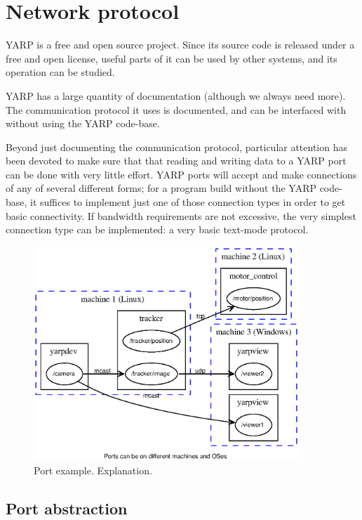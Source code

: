 
\section{Network protocol}

YARP is a free and open source project.  Since its source code is
released under a free and open license, useful parts of it can be used
by other systems, and its operation can be studied.

YARP has a large quantity of documentation (although we always need
more).  The communication protocol it uses is documented, and can be
interfaced with without using the YARP code-base.

Beyond just documenting the communication protocol, particular attention
has been devoted to make sure that that reading and writing data to a
YARP port can be done with very little effort.  YARP ports will 
accept and make connections of any of several different forms;
for a program build without the YARP code-base, it suffices
to implement just one of those connection types in order to
get basic connectivity.  If bandwidth requirements are not
excessive, the very simplest connection type can be implemented:
a very basic text-mode protocol.



\begin{figure}[t]
\centerline{
\includegraphics[width=10cm]{fig-ports}
}
\caption{
%
Port example.  Explanation.
%
}
\end{figure}





\subsection{Port abstraction}

